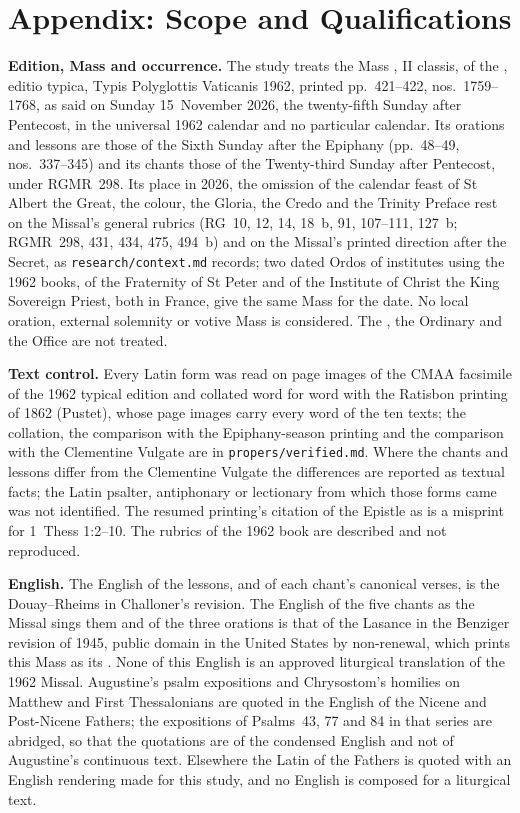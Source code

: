 \section{Appendix: Scope and Qualifications}
\label{sec:scope}

{\small
\textbf{Edition, Mass and occurrence.} The study treats the Mass
, II classis, of the
, editio typica, Typis Polyglottis Vaticanis 1962,
printed pp.~421--422, nos.~1759--1768, as said on Sunday 15~November 2026, the
twenty-fifth Sunday after Pentecost, in the universal 1962 calendar and no
particular calendar. Its orations and lessons are those of the Sixth Sunday
after the Epiphany (pp.~48--49, nos.~337--345) and its chants those of the
Twenty-third Sunday after Pentecost, under RGMR~298. Its place in 2026, the
omission of the calendar feast of St Albert the Great, the colour, the
Gloria, the Credo and the Trinity Preface rest on the Missal's general
rubrics (RG~10, 12, 14, 18~b, 91, 107--111, 127~b; RGMR~298, 431, 434, 475,
494~b) and on the Missal's printed direction after the Secret, as
\texttt{research/context.md} records; two dated Ordos of institutes using the
1962 books, of the Fraternity of St Peter and of the Institute of Christ the
King Sovereign Priest, both in France, give the same Mass for the date. No
local oration, external solemnity or votive Mass is considered. The
, the Ordinary and the Office are not treated.

\textbf{Text control.} Every Latin form was read on page images of the CMAA
facsimile of the 1962 typical edition and collated word for word with the
Ratisbon printing of 1862 (Pustet), whose page images carry every word of the
ten texts; the collation, the comparison with the Epiphany-season printing and
the comparison with the Clementine Vulgate are in \texttt{propers/verified.md}.
Where the chants and lessons differ from the Clementine Vulgate the
differences are reported as textual facts; the Latin psalter, antiphonary or
lectionary from which those forms came was not identified. The resumed
printing's citation of the Epistle as  is a misprint
for 1~Thess 1:2--10. The rubrics of the 1962 book are described and not
reproduced.

\textbf{English.} The English of the lessons, and of each chant's canonical
verses, is the Douay--Rheims in Challoner's revision. The English of the five
chants as the Missal sings them and of the three orations is that of the
Lasance  in the Benziger revision of 1945, public
domain in the United States by non-renewal, which prints this Mass as its
. None of this English is an approved liturgical
translation of the 1962 Missal. Augustine's psalm expositions and Chrysostom's
homilies on Matthew and First Thessalonians are quoted in the English of the
Nicene and Post-Nicene Fathers; the expositions of Psalms~43, 77 and 84 in
that series are abridged, so that the quotations are of the condensed English
and not of Augustine's continuous text. Elsewhere the Latin of the Fathers is
quoted with an English rendering made for this study, and no English is
composed for a liturgical text.

}
